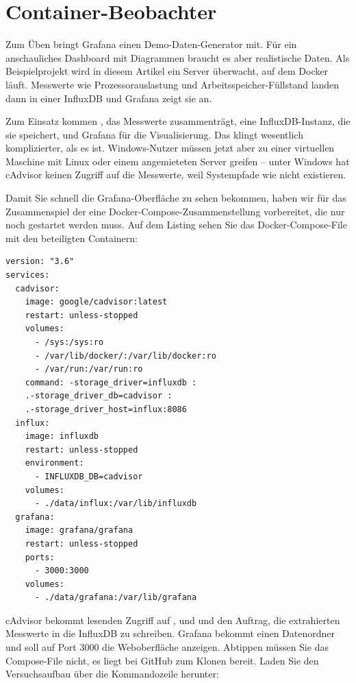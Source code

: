 \section{Container-Beobachter}


Zum Üben bringt Grafana einen Demo-Daten-Generator mit. Für ein anschauliches Dashboard mit Diagrammen braucht es aber realistische Daten. Als Beispielprojekt wird in diesem Artikel ein Server überwacht, auf dem Docker läuft. Messwerte wie Prozessorauslastung und Arbeitsspeicher-Füllstand landen dann in einer InfluxDB und Grafana zeigt sie an.

Zum Einsatz kommen , das Messwerte zusammenträgt, eine InfluxDB-Instanz, die sie speichert, und Grafana für die Visualisierung. Das klingt wesentlich komplizierter, als es ist. Windows-Nutzer müssen jetzt aber zu einer virtuellen Maschine mit Linux oder einem angemieteten Server greifen – unter Windows hat cAdvisor keinen Zugriff auf die Messwerte, weil Systempfade wie  nicht existieren.

Damit Sie schnell die Grafana-Oberfläche zu sehen bekommen, haben wir für das Zusammenspiel der  eine Docker-Compose-Zusammenstellung vorbereitet, die nur noch gestartet werden muss. Auf dem Listing sehen Sie das Docker-Compose-File mit den beteiligten Containern:


\begin{code}
  \begin{lstlisting}    
version: "3.6"
services:
  cadvisor:
    image: google/cadvisor:latest
    restart: unless-stopped
    volumes:
      - /sys:/sys:ro
      - /var/lib/docker/:/var/lib/docker:ro
      - /var/run:/var/run:ro
    command: -storage_driver=influxdb :
    .-storage_driver_db=cadvisor :
    .-storage_driver_host=influx:8086
  influx:
    image: influxdb
    restart: unless-stopped
    environment:
      - INFLUXDB_DB=cadvisor
    volumes:
      - ./data/influx:/var/lib/influxdb
  grafana:
    image: grafana/grafana
    restart: unless-stopped
    ports:
      - 3000:3000
    volumes:
      - ./data/grafana:/var/lib/grafana
  \end{lstlisting}

  \caption{Konfifuration von influxdb und Grafana}
\end{code}

cAdvisor bekommt lesenden Zugriff auf ,  und  und den Auftrag, die extrahierten Messwerte in die InfluxDB zu schreiben. Grafana bekommt einen Datenordner und soll auf Port 3000 die Weboberfläche anzeigen. Abtippen müssen Sie das Compose-File nicht, es liegt bei GitHub zum Klonen bereit. Laden Sie den Versuchsaufbau über die Kommandozeile herunter:

